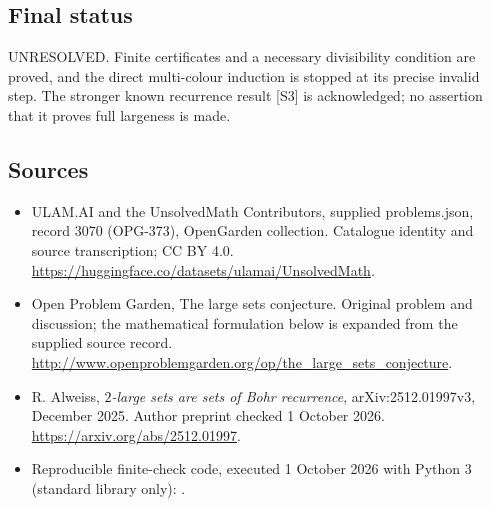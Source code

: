 \documentclass[11pt,a4paper]{article}
\begin{document}
\subsection{Final status}
UNRESOLVED. Finite certificates and a necessary divisibility condition
are proved, and the direct multi-colour induction is stopped at its
precise invalid step. The stronger known recurrence result [S3] is
acknowledged; no assertion that it proves full largeness is made.

\subsection{Sources}
\begin{itemize}
\item[S1] ULAM.AI and the UnsolvedMath Contributors, supplied problems.json, record 3070 (OPG-373), OpenGarden collection. Catalogue identity and source transcription; CC BY 4.0.
\url{https://huggingface.co/datasets/ulamai/UnsolvedMath}.
\item[S2] Open Problem Garden, The large sets conjecture. Original problem and discussion; the mathematical formulation below is expanded from the supplied source record.
\url{http://www.openproblemgarden.org/op/the_large_sets_conjecture}.
\item[S3] R. Alweiss, \emph{$2$-large sets are sets of Bohr recurrence}, arXiv:2512.01997v3, December 2025. Author preprint checked 1 October 2026.
\url{https://arxiv.org/abs/2512.01997}.
\item[C1] Reproducible finite-check code, executed 1 October 2026 with Python 3 (standard library only):
.
\end{itemize}
\end{document}
